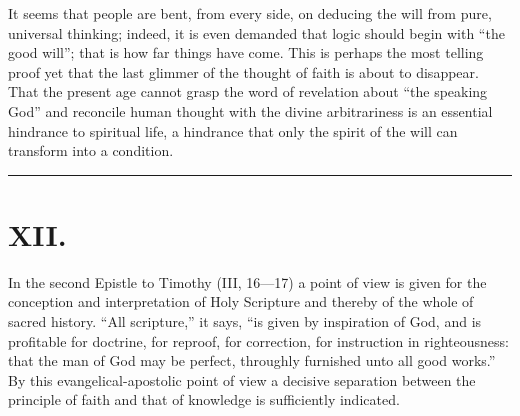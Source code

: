 \documentclass[12pt]{book}
\newcommand{\opage}[1]{\marginnote{\footnotesize\textit{[#1]}}}
\begin{document}
It seems that people are bent, from every side, on deducing the will from
pure, universal thinking; indeed, it is even demanded that logic should
begin with ``the good will''; that is how far things have come. This is
perhaps the most telling proof yet that the last glimmer of the thought of
faith is about to disappear. That the present age cannot grasp the word of
revelation about ``the speaking God'' and reconcile human thought with the
divine arbitrariness is an essential hindrance to spiritual life, a
hindrance that only the spirit of the will can transform into a condition.

\begin{center}\rule{3cm}{0.4pt}\end{center}

\chapter*{XII.}
\label{ch:xii}
\opage{194}\setcounter{footnote}{0}%
In the second Epistle to Timothy (III, 16---17) a point of view is given
for the conception and interpretation of Holy Scripture and thereby of the
whole of sacred history. ``All scripture,'' it says, ``is given by
inspiration of God, and is profitable for doctrine, for reproof, for
correction, for instruction in righteousness: that the man of God may be
perfect, throughly furnished unto all good works.'' By this
evangelical-apostolic point of view a decisive separation between the
principle of faith and that of knowledge is sufficiently indicated.
\end{document}
